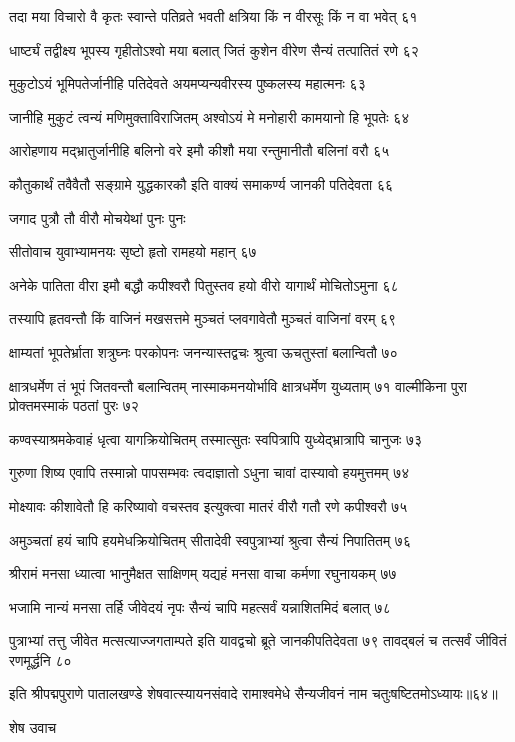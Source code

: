 तदा मया विचारो वै कृतः स्वान्ते पतिव्रते
भवती क्षत्रिया किं न वीरसूः किं न वा भवेत् ६१

धार्ष्ट्यं तद्वीक्ष्य भूपस्य गृहीतोऽश्वो मया बलात्
जितं कुशेन वीरेण सैन्यं तत्पातितं रणे ६२

मुकुटोऽयं भूमिपतेर्जानीहि पतिदेवते
अयमप्यन्यवीरस्य पुष्कलस्य महात्मनः ६३

जानीहि मुकुटं त्वन्यं मणिमुक्ताविराजितम्
अश्वोऽयं मे मनोहारी कामयानो हि भूपतेः ६४

आरोहणाय मद्भ्रातुर्जानीहि बलिनो वरे
इमौ कीशौ मया रन्तुमानीतौ बलिनां वरौ ६५

कौतुकार्थं तवैवैतौ सङ्ग्रामे युद्धकारकौ
इति वाक्यं समाकर्ण्य जानकी पतिदेवता ६६

जगाद पुत्रौ तौ वीरौ मोचयेथां पुनः पुनः

सीतोवाच
युवाभ्यामनयः सृष्टो हृतो रामहयो महान् ६७

अनेके पातिता वीरा इमौ बद्धौ कपीश्वरौ
पितुस्तव हयो वीरो यागार्थं मोचितोऽमुना ६८

तस्यापि हृतवन्तौ किं वाजिनं मखसत्तमे
मुञ्चतं प्लवगावेतौ मुञ्चतं वाजिनां वरम् ६९

क्षाम्यतां भूपतेर्भ्राता शत्रुघ्नः परकोपनः
जनन्यास्तद्वचः श्रुत्वा ऊचतुस्तां बलान्वितौ ७०

क्षात्रधर्मेण तं भूपं जितवन्तौ बलान्वितम्
नास्माकमनयोर्भावि क्षात्रधर्मेण युध्यताम् ७१
वाल्मीकिना पुरा प्रोक्तमस्माकं पठतां पुरः ७२

कण्वस्याश्रमकेवाहं धृत्वा यागक्रियोचितम्
तस्मात्सुतः स्वपित्रापि युध्येद्भ्रात्रापि चानुजः ७३

गुरुणा शिष्य एवापि तस्मान्नो पापसम्भवः
त्वदाज्ञातो ऽधुना चावां दास्यावो हयमुत्तमम् ७४

मोक्ष्यावः कीशावेतौ हि करिष्यावो वचस्तव
इत्युक्त्वा मातरं वीरौ गतौ रणे कपीश्वरौ ७५

अमुञ्चतां हयं चापि हयमेधक्रियोचितम्
सीतादेवी स्वपुत्राभ्यां श्रुत्वा सैन्यं निपातितम् ७६

श्रीरामं मनसा ध्यात्वा भानुमैक्षत साक्षिणम्
यद्यहं मनसा वाचा कर्मणा रघुनायकम् ७७

भजामि नान्यं मनसा तर्हि जीवेदयं नृपः
सैन्यं चापि महत्सर्वं यन्नाशितमिदं बलात् ७८

पुत्राभ्यां तत्तु जीवेत मत्सत्याज्जगताम्पते
इति यावद्वचो ब्रूते जानकीपतिदेवता ७९
तावद्बलं च तत्सर्वं जीवितं रणमूर्द्धनि ८०

इति श्रीपद्मपुराणे पातालखण्डे शेषवात्स्यायनसंवादे रामाश्वमेधे सैन्यजीवनं नाम चतुःषष्टितमोऽध्यायः॥६४॥


शेष उवाच


